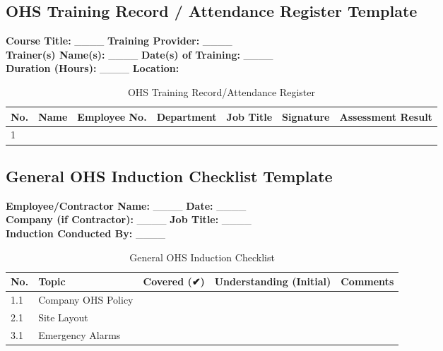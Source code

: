 \documentclass[11pt]{article}
\newcommand{\location}{}
\begin{document}
\subsection*{OHS Training Record / Attendance Register Template}

\textbf{Course Title:} \_\_\_\_ \textbf{Training Provider:} \_\_\_\_ \\
\textbf{Trainer(s) Name(s):} \_\_\_\_ \textbf{Date(s) of Training:} \_\_\_\_ \\
\textbf{Duration (Hours):} \_\_\_\_ \textbf{Location:} \location

\begin{table}[h]
    \centering
    \begin{tabular}{p{1cm}p{3cm}p{2cm}p{2cm}p{2cm}p{2cm}p{2cm}}
        \toprule
        \textbf{No.} & \textbf{Name} & \textbf{Employee No.} & \textbf{Department} & \textbf{Job Title} & \textbf{Signature} & \textbf{Assessment Result} \\
        \midrule
        1 & & & & & & \\
        \bottomrule
    \end{tabular}
    \caption{OHS Training Record/Attendance Register}
\end{table}

\subsection*{General OHS Induction Checklist Template}

\textbf{Employee/Contractor Name:} \_\_\_\_ \textbf{Date:} \_\_\_\_ \\
\textbf{Company (if Contractor):} \_\_\_\_ \textbf{Job Title:} \_\_\_\_ \\
\textbf{Induction Conducted By:} \_\_\_\_

\begin{table}[h]
    \centering
    \begin{tabular}{p{1cm}p{4cm}p{2cm}p{2cm}p{3cm}}
        \toprule
        \textbf{No.} & \textbf{Topic} & \textbf{Covered (✔)} & \textbf{Understanding (Initial)} & \textbf{Comments} \\
        \midrule
        1.1 & Company OHS Policy & & & \\
        2.1 & Site Layout & & & \\
        3.1 & Emergency Alarms & & & \\
        \bottomrule
    \end{tabular}
    \caption{General OHS Induction Checklist}
\end{table}
\end{document}
